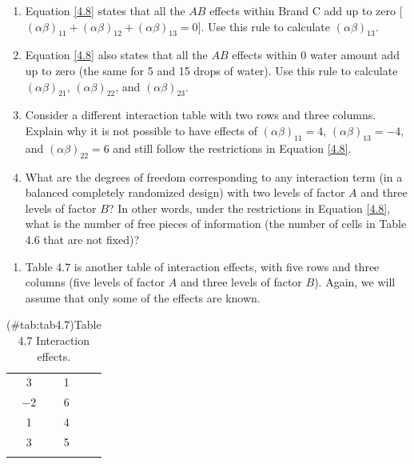 \documentclass[
]{report}
\providecommand{\tightlist}{%
  \setlength{\itemsep}{0pt}\setlength{\parskip}{0pt}}
\begin{document}
\begin{enumerate}
\def\labelenumi{\alph{enumi}.}
\item
  Equation \ref{4.8} states that all the \(AB\) effects within Brand C add up to zero {[}\((\alpha\beta)_{11} + (\alpha\beta)_{12} + (\alpha\beta)_{13} = 0\){]}. Use this rule to calculate \((\alpha\beta)_{13}\).
\item
  Equation \ref{4.8} also states that all the \(AB\) effects within 0 water amount add up to zero (the same for 5 and 15 drops of water). Use this rule to calculate \((\alpha\beta)_{21}\), \((\alpha\beta)_{22}\), and \((\alpha\beta)_{23}\).
\item
  Consider a different interaction table with two rows and three columns. Explain why it is not possible to have effects of \((\alpha\beta)_{11} = 4\), \((\alpha\beta)_{13} = -4\), and \((\alpha\beta)_{22} = 6\) and still follow the restrictions in Equation \ref{4.8}.
\item
  What are the degrees of freedom corresponding to any interaction term (in a balanced completely randomized design) with two levels of factor \(A\) and three levels of factor \(B\)? In other words, under the restrictions in Equation \ref{4.8}, what is the number of free pieces of information (the number of cells in Table 4.6 that are not fixed)?
\end{enumerate}

\begin{enumerate}
\def\labelenumi{\arabic{enumi}.}
\setcounter{enumi}{31}
\tightlist
\item
  Table 4.7 is another table of interaction effects, with five rows and three columns (five levels of factor \(A\) and three levels of factor \(B\)). Again, we will assume that only some of the effects are known.
\end{enumerate}

\begin{table}[!h]
\centering
\caption{(\#tab:tab4.7)Table 4.7 Interaction effects.}
\centering
\begin{tabular}[t]{ccc}
\toprule
  &   &  \\
\midrule
3 & 1 & \\
$-2$ & 6 & \\
1 & 4 & \\
3 & 5 & \\
 &  & \\
\bottomrule
\end{tabular}
\end{table}
\end{document}
